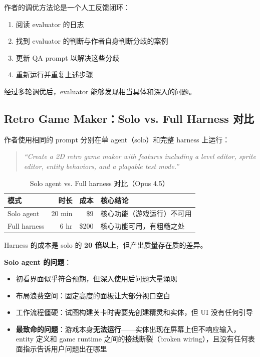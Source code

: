 作者的调优方法论是一个人工反馈闭环：

\begin{enumerate}[leftmargin=1.5em]
    \item 阅读 evaluator 的日志
    \item 找到 evaluator 的判断与作者自身判断分歧的案例
    \item 更新 QA prompt 以解决这些分歧
    \item 重新运行并重复上述步骤
\end{enumerate}

经过多轮调优后，evaluator 能够发现相当具体和深入的问题。

\subsection{Retro Game Maker：Solo vs. Full Harness 对比}

作者使用相同的 prompt 分别在单 agent（solo）和完整 harness 上运行：

\begin{quote}
\textit{``Create a 2D retro game maker with features including a level editor, sprite editor, entity behaviors, and a playable test mode.''}
\end{quote}

\begin{table}[H]
\centering
\renewcommand{\arraystretch}{1.3}
\begin{tabular}{lrrl}
\toprule
\textbf{模式} & \textbf{时长} & \textbf{成本} & \textbf{核心结论} \\
\midrule
Solo agent & 20 min & \$9 & 核心功能（游戏运行）不可用 \\
Full harness & 6 hr & \$200 & 核心功能可用，有粗糙之处 \\
\bottomrule
\end{tabular}
\caption{Solo agent vs. Full harness 对比（Opus 4.5）}
\end{table}

Harness 的成本是 solo 的 \textbf{20 倍以上}，但产出质量存在质的差异。

\textbf{Solo agent 的问题}：
\begin{itemize}[leftmargin=1.5em]
    \item 初看界面似乎符合预期，但深入使用后问题大量涌现
    \item 布局浪费空间：固定高度的面板让大部分视口空白
    \item 工作流程僵硬：试图构建关卡时需要先创建精灵和实体，但 UI 没有任何引导
    \item \textbf{最致命的问题}：游戏本身\textbf{无法运行}——实体出现在屏幕上但不响应输入，entity 定义和 game runtime 之间的接线断裂（broken wiring），且没有任何表面指示告诉用户问题出在哪里
\end{itemize}

